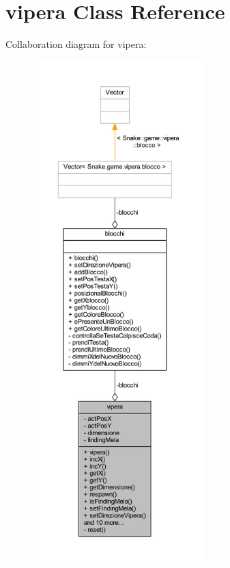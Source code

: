 \hypertarget{class_snake_1_1game_1_1vipera_1_1vipera}{}\section{vipera Class Reference}
\label{class_snake_1_1game_1_1vipera_1_1vipera}


Collaboration diagram for vipera\+:
\nopagebreak
\begin{figure}[H]
\begin{center}
\leavevmode
\includegraphics[height=550pt]{class_snake_1_1game_1_1vipera_1_1vipera__coll__graph}
\end{center}
\end{figure}
